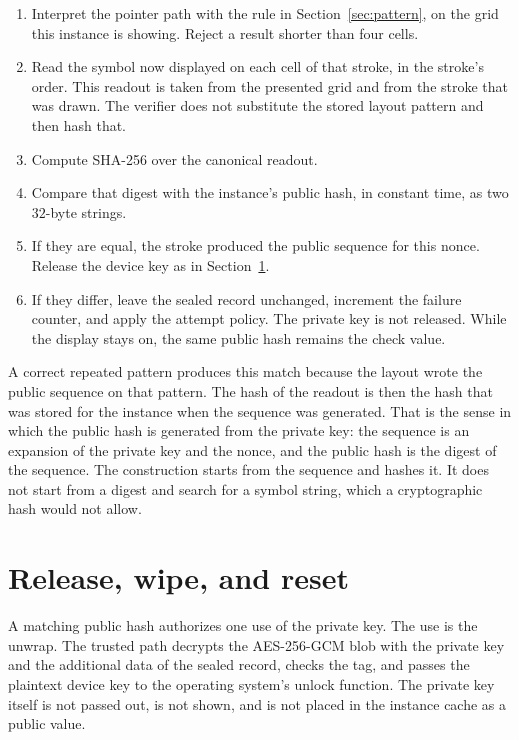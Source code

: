 \documentclass[11pt]{article}
\begin{document}
\begin{enumerate}
  \item Interpret the pointer path with the rule in Section~\ref{sec:pattern}, on the grid this instance is showing.
        Reject a result shorter than four cells.
  \item Read the symbol now displayed on each cell of that stroke, in the stroke's order.
        This readout is taken from the presented grid and from the stroke that was drawn.
        The verifier does not substitute the stored layout pattern and then hash that.
  \item Compute SHA-256 over the canonical readout.
  \item Compare that digest with the instance's public hash, in constant time, as two \(32\)-byte strings.
  \item If they are equal, the stroke produced the public sequence for this nonce.
        Release the device key as in Section~\ref{sec:release}.
  \item If they differ, leave the sealed record unchanged, increment the failure counter, and apply the attempt policy.
        The private key is not released.
        While the display stays on, the same public hash remains the check value.
\end{enumerate}

A correct repeated pattern produces this match because the layout wrote the public sequence on that pattern.
The hash of the readout is then the hash that was stored for the instance when the sequence was generated.
That is the sense in which the public hash is generated from the private key: the sequence is an expansion of the private key and the nonce, and the public hash is the digest of the sequence.
The construction starts from the sequence and hashes it.
It does not start from a digest and search for a symbol string, which a cryptographic hash would not allow.

\section{Release, wipe, and reset}
\label{sec:release}

A matching public hash authorizes one use of the private key.
The use is the unwrap.
The trusted path decrypts the AES-256-GCM blob with the private key and the additional data of the sealed record, checks the tag, and passes the plaintext device key to the operating system's unlock function.
The private key itself is not passed out, is not shown, and is not placed in the instance cache as a public value.
\end{document}

